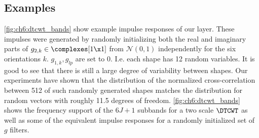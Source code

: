 \subsection{Examples}
\autoref{fig:ch6:dtcwt_bands} show example impulse responses of our layer.
These impulses were generated by randomly initializing both the real and
imaginary parts of $g_{2,k} \in \complexes[1\x 1]$ from $\mathcal{N}(0,1)$
independently for the six orientations $k$. $g_{1,k}, g_{lp}$ are set to 0. 
I.e. each shape has 12 random variables. It is good
to see that there is still a large degree of variability between shapes. Our
experiments have shown that the distribution of the normalized cross-correlation
between 512 of such randomly generated shapes matches the distribution for
random vectors with roughly 11.5 degrees of freedom.
\autoref{fig:ch6:dtcwt_bands} shows the frequency support of the $6J+1$ subbands
for a two scale $\DTCWT$ as well as some of the equivalent impulse responses for
a randomly initialized set of $g$ filters.


